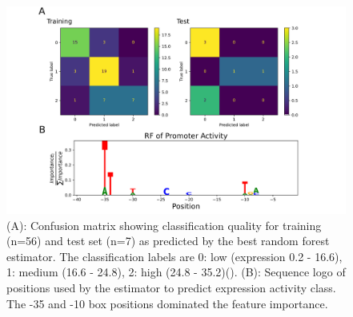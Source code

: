 \documentclass[utf8]{frontiersSCNS} %
\begin{document}
\newpage
\begin{figure}[h!]
    \begin{center}
        \includegraphics[width=.85\linewidth]{Figures/2103_Pput-ConfMat.png}
    \end{center}
    \caption{(A): Confusion matrix showing classification quality for training (n=56) and test set (n=7) as predicted by the best random forest estimator. The classification labels are 0: low (expression 0.2 - 16.6), 1: medium (16.6 - 24.8), 2: high (24.8 - 35.2)(\citep{Kobbing2020}). (B): Sequence logo of positions used by the estimator to predict expression activity class. The -35 and -10 box positions dominated the feature importance.}
    \label{Fig:PputConfMatr}
\end{figure}
\end{document}
